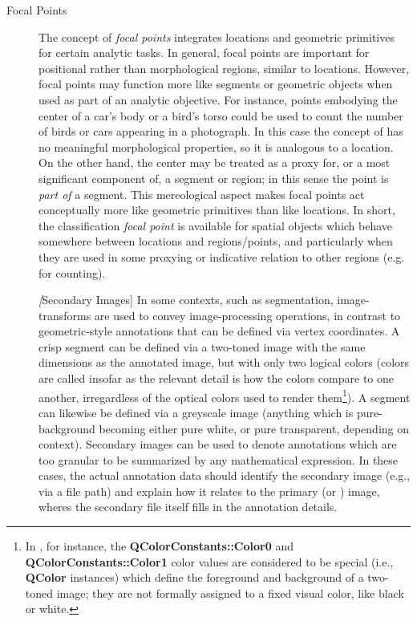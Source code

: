 {\begin{description}
\item[Focal Points]  The concept of \textit{focal 
points} integrates locations and geometric primitives 
for certain analytic tasks.  In general, focal points 
are important for positional rather than morphological 
regions, similar to locations.  However, focal points 
may function more like segments or geometric objects 
when used as part of an analytic objective.  For 
instance, points embodying the center of a car's body 
or a bird's torso could be used to count the number 
of birds or cars appearing in a photograph.  
In this case the concept of  has 
no meaningful morphological properties, so it 
is analogous to a location.  On the other hand, the 
center may be treated as a proxy for, or a most 
significant component of, a segment or region; in this 
sense the point is \textit{part of} a segment.  
This mereological aspect makes focal points 
act conceptually more like geometric primitives than 
like locations.  In short, the classification 
\textit{focal point} is available for spatial 
objects which behave somewhere between locations 
and regions/points, and particularly when they 
are used in some proxying or indicative relation 
to other regions (e.g. for counting).  
   
\textit[Secondary Images]  In some contexts, such 
as segmentation, image-transforms are used to 
convey image-processing operations, in contrast 
to geometric-style annotations that can be 
defined via vertex coordinates.  A crisp 
segment can be defined via a two-toned image 
with the same dimensions as the annotated 
image, but with only two logical colors 
(colors are called  insofar as the 
relevant detail is how the colors compare to 
one another, irregardless of the optical colors 
used to render them\footnote{In \Qt{}, for instance, 
the \textbf{QColorConstants::Color0} and 
\textbf{QColorConstants::Color1} color values 
are considered to be special  
(i.e., \textbf{QColor} instances) which define 
the foreground and background of a two-toned 
image; they are not formally assigned to a 
fixed visual color, like black or white.}).  
A  segment can likewise be defined 
via a greyscale image (anything which 
is pure-background becoming either pure white, 
or pure transparent, depending on context).  
Secondary images can be used to denote annotations 
which are too granular to be summarized by 
any mathematical expression.  In these cases, 
the actual annotation data should identify the 
secondary image (e.g., via a file path) and 
explain how it relates to the primary 
(or ) image, wheres the secondary 
file itself fills in the annotation details.      

\end{description}

 }





